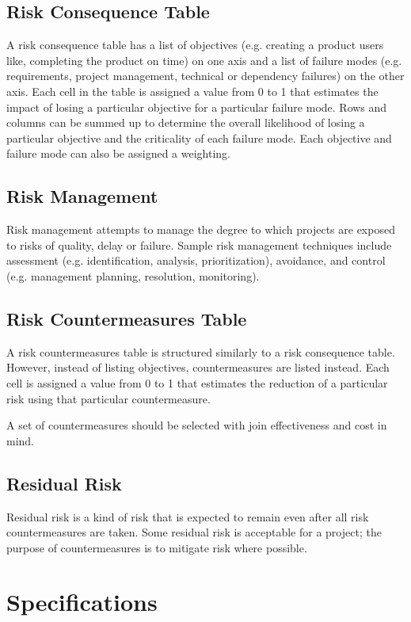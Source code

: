 \documentclass[12pt,titlepage]{article}
\let\stdsection\section
\renewcommand\section{\clearpage\stdsection}
\begin{document}
    \subsection{Risk Consequence Table}
      A risk consequence table has a list of objectives (e.g. creating a product users like, completing the product on time) on one axis
      and a list of failure modes (e.g. requirements, project management, technical or dependency failures) on the other axis. Each cell in the
      table is assigned a value from 0 to 1 that estimates the impact of losing a particular objective for a particular failure mode. Rows and
      columns can be summed up to determine the overall likelihood of losing a particular objective and the criticality of each failure mode. Each
      objective and failure mode can also be assigned a weighting.

    \subsection{Risk Management}
      Risk management attempts to manage the degree to which projects are exposed to risks of quality, delay or failure. Sample risk management
      techniques include assessment (e.g. identification, analysis, prioritization), avoidance, and control (e.g. management planning, resolution,
      monitoring).

    \subsection{Risk Countermeasures Table}
      A risk countermeasures table is structured similarly to a risk consequence table. However, instead of listing objectives, countermeasures are
      listed instead. Each cell is assigned a value from 0 to 1 that estimates the reduction of a particular risk using that particular countermeasure.

      A set of countermeasures should be selected with join effectiveness and cost in mind.

    \subsection{Residual Risk}
      Residual risk is a kind of risk that is expected to remain even after all risk countermeasures are taken. Some residual risk is acceptable for a
      project; the purpose of countermeasures is to mitigate risk where possible.

  \section{Specifications}
\end{document}
